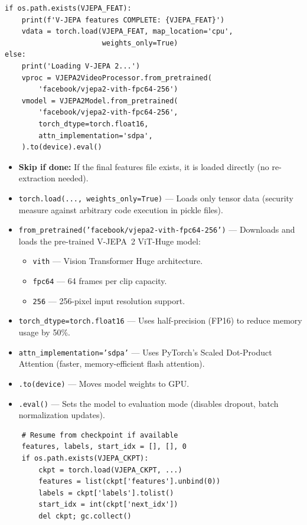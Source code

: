 \begin{lstlisting}
if os.path.exists(VJEPA_FEAT):
    print(f'V-JEPA features COMPLETE: {VJEPA_FEAT}')
    vdata = torch.load(VJEPA_FEAT, map_location='cpu',
                       weights_only=True)
else:
    print('Loading V-JEPA 2...')
    vproc = VJEPA2VideoProcessor.from_pretrained(
        'facebook/vjepa2-vith-fpc64-256')
    vmodel = VJEPA2Model.from_pretrained(
        'facebook/vjepa2-vith-fpc64-256',
        torch_dtype=torch.float16,
        attn_implementation='sdpa',
    ).to(device).eval()
\end{lstlisting}

\begin{explanation}
\begin{itemize}[nosep]
  \item \textbf{Skip if done:} If the final features file exists, it is loaded directly (no re-extraction needed).
  \item \texttt{torch.load(..., weights\_only=True)} --- Loads only tensor data (security measure against arbitrary code execution in pickle files).
  \item \texttt{from\_pretrained('facebook/vjepa2-vith-fpc64-256')} --- Downloads and loads the pre-trained V-JEPA~2 ViT-Huge model:
  \begin{itemize}[nosep]
    \item \texttt{vith} --- Vision Transformer Huge architecture.
    \item \texttt{fpc64} --- 64 frames per clip capacity.
    \item \texttt{256} --- 256-pixel input resolution support.
  \end{itemize}
  \item \texttt{torch\_dtype=torch.float16} --- Uses half-precision (FP16) to reduce memory usage by 50\%.
  \item \texttt{attn\_implementation='sdpa'} --- Uses PyTorch's Scaled Dot-Product Attention (faster, memory-efficient flash attention).
  \item \texttt{.to(device)} --- Moves model weights to GPU.
  \item \texttt{.eval()} --- Sets the model to evaluation mode (disables dropout, batch normalization updates).
\end{itemize}
\end{explanation}

\begin{lstlisting}
    # Resume from checkpoint if available
    features, labels, start_idx = [], [], 0
    if os.path.exists(VJEPA_CKPT):
        ckpt = torch.load(VJEPA_CKPT, ...)
        features = list(ckpt['features'].unbind(0))
        labels = ckpt['labels'].tolist()
        start_idx = int(ckpt['next_idx'])
        del ckpt; gc.collect()
\end{lstlisting}

